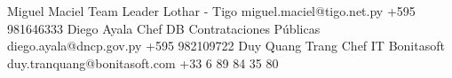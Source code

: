 %
%
%

\begin{referees}
		{Miguel Maciel}
		{Team Leader}
		{Lothar - Tigo}
		{miguel.maciel@tigo.net.py}
		{+595 981646333}
		{Diego Ayala}
		{Chef DB}
		{Contrataciones Públicas}
		{diego.ayala@dncp.gov.py}
		{+595 982109722}
		{Duy Quang Trang}
		{Chef IT}
		{Bonitasoft}
		{duy.tranquang@bonitasoft.com}
		{+33 6 89 84 35 80‬}
\end{referees}